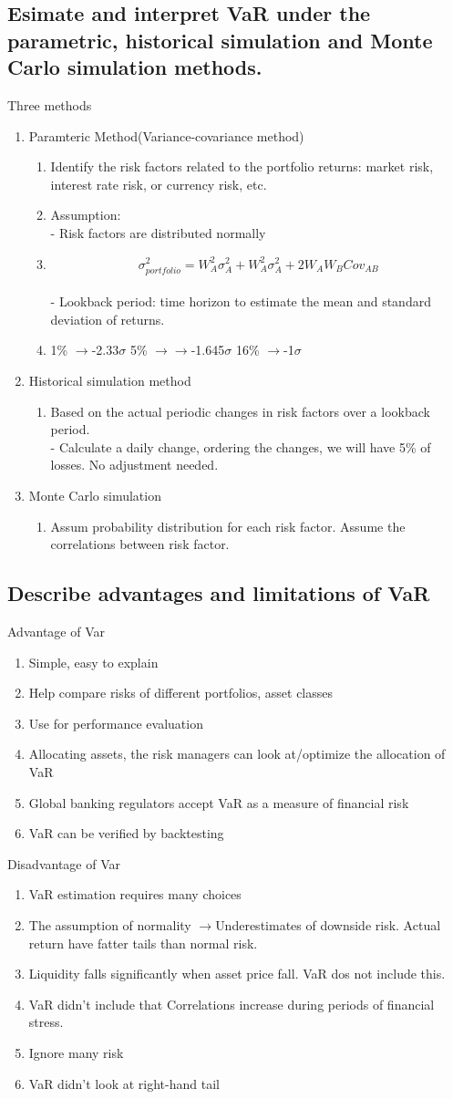 \documentclass{article}
\newcommand{\be}{\begin{enumerate}}
\newcommand{\ee}{\end{enumerate}}
\newcommand{\ra}{$\rightarrow$}
\begin{document}
\subsection{Esimate and interpret VaR under the parametric, historical simulation and Monte Carlo
simulation methods.}
Three methods
\be
    \item Paramteric Method(Variance-covariance method)
    \be
        \item Identify the risk factors related to the portfolio returns: market risk, interest
        rate risk, or currency risk, etc.
        \item Assumption:
            \\ - Risk factors are distributed normally
        \item $$
            \sigma_{portfolio}^2=W_A^2\sigma_A^2+W_A^2\sigma_A^2+2W_A W_B Cov_{AB}
        $$
        \\ - Lookback period: time horizon to estimate the mean and standard deviation of returns.
        \item 1\% \ra -2.33$\sigma$
        5\% \ra \ra -1.645$\sigma$
        16\% \ra -1$\sigma$
    \ee
    \item Historical simulation method
    \be
        \item Based on the actual periodic changes in risk factors over a lookback period.
        \\ - Calculate a daily change, ordering the changes, we will have 5\% of losses. No adjustment needed.
    \ee
    \item Monte Carlo simulation
    \be
        \item Assum probability distribution for each risk factor. Assume the correlations between
        risk factor.
    \ee
\ee
\subsection{Describe advantages and limitations of VaR}
Advantage of Var
\be
    \item Simple, easy to explain
    \item Help compare risks of different portfolios, asset classes
    \item Use for performance evaluation
    \item Allocating assets, the risk managers can look at/optimize the allocation of VaR
    \item Global banking regulators accept VaR as a measure of financial risk
    \item VaR can be verified by backtesting
\ee
Disadvantage of Var
\be
    \item VaR estimation requires many choices
    \item The assumption of normality \ra Underestimates of downside risk. Actual return have fatter
    tails than normal risk.
    \item Liquidity falls significantly when asset price fall. VaR dos not include this.
    \item VaR didn't include that Correlations increase during periods of financial stress.
    \item Ignore many risk
    \item VaR didn't look at right-hand tail
\ee
\end{document}
